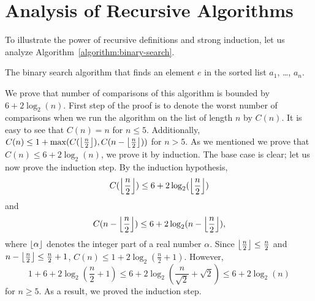 \section{Analysis of Recursive Algorithms}
To illustrate the power of recursive definitions and strong induction, let us
analyze Algorithm~\ref{algorithm:binary-search}.
\begin{algorithm}
  \begin{algorithmic}[1]
            \State{}
          \EndIf
        \EndFor
      \Else
          \State{}
        \Else
          \State{}
        \EndIf
      \EndIf
    \EndFunction
  \end{algorithmic}
  \caption{The binary search algorithm that finds an element $e$ in the sorted
    list $a_1$, \dots, $a_n$.}
  \label{algorithm:binary-search}
\end{algorithm}
We prove that number of comparisons of this algorithm is bounded by
$6 + 2\log_2(n)$. First step of the proof is to denote the worst
number of comparisons when we run the algorithm on the list of length $n$ by
$C(n)$. It is easy to see that $C(n) = n$ for $n \le 5$. Additionally,
$C(n) \le 1 + \max(C(\left\lfloor {\frac{n}{2}} \right\rfloor), C(n - \left\lfloor {\frac{n}{2}} \right\rfloor))$ for
$n > 5$. As we mentioned we prove that $C(n) \le 6 + 2\log_2(n)$, we prove it
by induction. The base case is clear; let us now prove the induction step.
By the induction hypothesis,
\[
  C(\left\lfloor {\frac{n}{2}} \right\rfloor) \le 6 + 2\log_2(\left\lfloor {\frac{n}{2}} \right\rfloor)
\]
and
\[
  C(n - \left\lfloor {\frac{n}{2}} \right\rfloor) \le 6 + 2\log_2(n - \left\lfloor {\frac{n}{2}} \right\rfloor),
\]
where $\left\lfloor {\alpha} \right\rfloor$ denotes the integer part of a real number $\alpha$.
Since $\left\lfloor {\frac{n}{2}} \right\rfloor \le \frac{n}{2}$ and $n - \left\lfloor {\frac{n}{2}} \right\rfloor \le
\frac{n}{2} + 1$, $C(n) \le 1 + 2\log_2(\frac{n}{2} + 1)$.
However,
\[
  1 + 6 + 2\log_2\left(\frac{n}{2} + 1\right) \le
  6 + 2\log_2\left(\frac{n}{\sqrt{2}} + \sqrt{2}\right) \le 6 + 2 \log_2(n)
\]
for $n \ge 5$. As a result, we proved the induction step.


